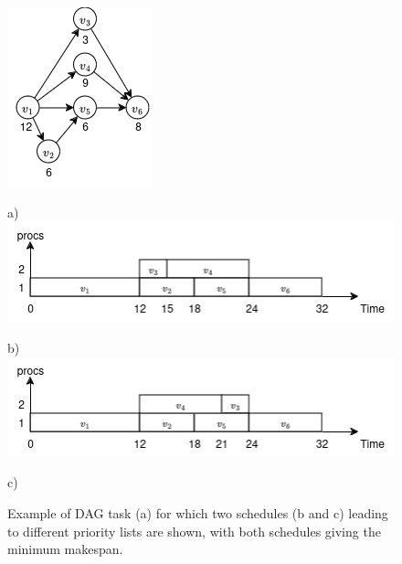 \begin{figure}
    \centering
    \includegraphics[width=0.5\linewidth]{images/dag_same_makespan_diff_scheds.png}
    \par a)
    \includegraphics[width=\linewidth]{images/first_samemakespan_diff_sched.png}
    \par b)
    \includegraphics[width=\linewidth]{images/second_samemakespan_diff_sched.png}
    \par c)
    \caption{Example of DAG task (a) for which two schedules (b and c) leading to different
    priority lists are shown, with both schedules giving the minimum makespan.}
    \label{fig:not_unique_schedules}    
\end{figure}


